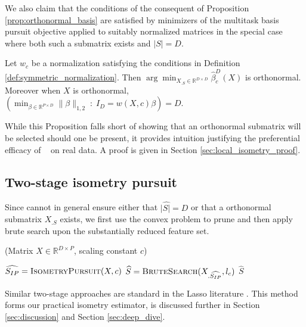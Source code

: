 We also claim that the conditions of the consequent of Proposition \ref{prop:orthonormal_basis} are satisfied by minimizers of the multitask basis pursuit objective applied to suitably normalized matrices in the special case where both such a submatrix exists and $| S| = D$.
\begin{proposition}
Let $w_c$ be a normalization satisfying the conditions in Definition \ref{def:symmetric_normalization}.
Then $\arg \min_{X_{.S} \in \mathbb R^{D \times D}} \widehat \beta^{D}_c ( X) $ is orthonormal.
Moreover when $X$ is orthonormal, $(\min_{\beta \in \mathbb R^{P \times D}} \| \beta \|_{1,2} \; : \; I_D = w ({  X}, c) \beta) = D$.
\label{prop:unitary_selection}
\end{proposition}
While this Proposition falls short of showing that an orthonormal submatrix will be selected should one be present, it provides intuition justifying the preferential efficacy of \isometrypursuit~ on real data.
A proof is given in Section \ref{sec:local_isometry_proof}.

\subsection{Two-stage isometry pursuit}

Since cannot in general ensure either that $|\widehat {  S|} = D$ or that a orthonormal submatrix $X_{.S}$ exists, we first use the convex problem to prune and then apply brute search upon the substantially reduced feature set.

\begin{algorithm}[H]
\caption{\tsip(Matrix ${X} \in \mathbb{R}^{D \times P}$, scaling constant $c$)}
\begin{algorithmic}[1]
\STATE $\widehat{S_{IP}} = \text{{\sc IsometryPursuit}}( X, c)$
\STATE $\widehat{S} = \text {{\sc BruteSearch}}({X}_{.\widehat{S_{IP}}}, l_c)$
 $\widehat{S}$
\end{algorithmic}
\end{algorithm}

Similar two-stage approaches are standard in the Lasso literature \cite{Hesterberg2008-iy}.
This method forms our practical isometry estimator, is discussed further in Section \ref{sec:discussion} and Section \ref{sec:deep_dive}.